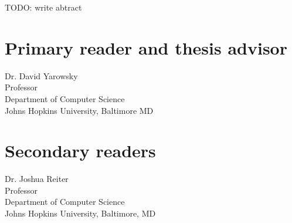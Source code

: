 



TODO: write abtract




\begin{singlespace}

    \section*{Primary reader and thesis advisor}
    
    Dr. David Yarowsky \\
    Professor\\
    Department of Computer Science\\
    Johns Hopkins University, Baltimore MD 

    \section*{Secondary readers}
    
    Dr. Joshua Reiter\\
    Professor\\
    Department of Computer Science \\
    Johns Hopkins University, Baltimore, MD 
    
    \vspace{0.1in}
     



\end{singlespace}